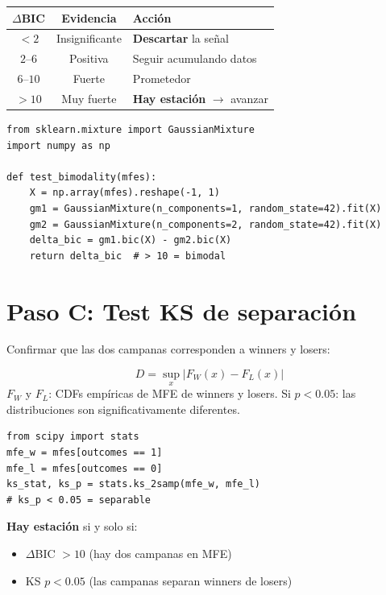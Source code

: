 \documentclass[11pt,a4paper]{article}
\begin{document}
\begin{tcolorbox}[decision, title=Escala de interpretaci\'on (Kass-Raftery 1995)]
\renewcommand{\arraystretch}{1.3}
\begin{tabular}{ccl}
$\Delta$\textbf{BIC} & \textbf{Evidencia} & \textbf{Acci\'on} \\
\midrule
$< 2$ & Insignificante & \textbf{Descartar} la se\~nal \\
$2$--$6$ & Positiva & Seguir acumulando datos \\
$6$--$10$ & Fuerte & Prometedor \\
$> 10$ & Muy fuerte & \textbf{Hay estaci\'on} $\to$ avanzar \\
\end{tabular}
\end{tcolorbox}

\begin{lstlisting}
from sklearn.mixture import GaussianMixture
import numpy as np

def test_bimodality(mfes):
    X = np.array(mfes).reshape(-1, 1)
    gm1 = GaussianMixture(n_components=1, random_state=42).fit(X)
    gm2 = GaussianMixture(n_components=2, random_state=42).fit(X)
    delta_bic = gm1.bic(X) - gm2.bic(X)
    return delta_bic  # > 10 = bimodal
\end{lstlisting}

\section{Paso C: Test KS de separaci\'on}

Confirmar que las dos campanas corresponden a winners y losers:

\begin{tcolorbox}[formula, title=Test Kolmogorov-Smirnov]
\begin{equation}
D = \sup_x |F_W(x) - F_L(x)|
\end{equation}
$F_W$ y $F_L$: CDFs emp\'iricas de MFE de winners y losers. Si $p < 0.05$: las distribuciones son significativamente diferentes.
\end{tcolorbox}

\begin{lstlisting}
from scipy import stats
mfe_w = mfes[outcomes == 1]
mfe_l = mfes[outcomes == 0]
ks_stat, ks_p = stats.ks_2samp(mfe_w, mfe_l)
# ks_p < 0.05 = separable
\end{lstlisting}

\begin{tcolorbox}[warn, title=Ambas condiciones son necesarias]
\textbf{Hay estaci\'on} si y solo si:
\begin{itemize}[leftmargin=1.5em]
\item $\Delta$BIC $> 10$ (hay dos campanas en MFE)
\item KS $p < 0.05$ (las campanas separan winners de losers)
\end{itemize}
\end{tcolorbox}
\end{document}
